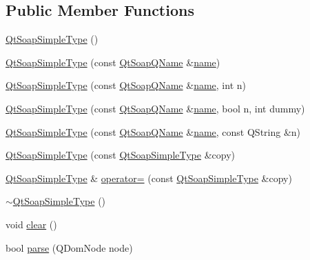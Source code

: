 \subsection*{Public Member Functions}
\begin{DoxyCompactItemize}
\item 
\mbox{\hyperlink{class_qt_soap_simple_type_ab0d80dc82ccc45e589d92f6d0dd95f94}{Qt\+Soap\+Simple\+Type}} ()
\item 
\mbox{\hyperlink{class_qt_soap_simple_type_adff3b31f44bd9520a4d7a9b61f9831ac}{Qt\+Soap\+Simple\+Type}} (const \mbox{\hyperlink{class_qt_soap_q_name}{Qt\+Soap\+Q\+Name}} \&\mbox{\hyperlink{class_qt_soap_type_a6d5fb3d1ea4cf6d1432c7f62a5da09c3}{name}})
\item 
\mbox{\hyperlink{class_qt_soap_simple_type_a68d489b4ad93f0895589953343066853}{Qt\+Soap\+Simple\+Type}} (const \mbox{\hyperlink{class_qt_soap_q_name}{Qt\+Soap\+Q\+Name}} \&\mbox{\hyperlink{class_qt_soap_type_a6d5fb3d1ea4cf6d1432c7f62a5da09c3}{name}}, int n)
\item 
\mbox{\hyperlink{class_qt_soap_simple_type_a3cb161c0fb5d1a4b310e97822935f0f8}{Qt\+Soap\+Simple\+Type}} (const \mbox{\hyperlink{class_qt_soap_q_name}{Qt\+Soap\+Q\+Name}} \&\mbox{\hyperlink{class_qt_soap_type_a6d5fb3d1ea4cf6d1432c7f62a5da09c3}{name}}, bool n, int dummy)
\item 
\mbox{\hyperlink{class_qt_soap_simple_type_aa71a79ea37f68605be315f95cbc909e7}{Qt\+Soap\+Simple\+Type}} (const \mbox{\hyperlink{class_qt_soap_q_name}{Qt\+Soap\+Q\+Name}} \&\mbox{\hyperlink{class_qt_soap_type_a6d5fb3d1ea4cf6d1432c7f62a5da09c3}{name}}, const Q\+String \&n)
\item 
\mbox{\hyperlink{class_qt_soap_simple_type_a287b8d2032e92c1d8a3d6a916097e10f}{Qt\+Soap\+Simple\+Type}} (const \mbox{\hyperlink{class_qt_soap_simple_type}{Qt\+Soap\+Simple\+Type}} \&copy)
\item 
\mbox{\hyperlink{class_qt_soap_simple_type}{Qt\+Soap\+Simple\+Type}} \& \mbox{\hyperlink{class_qt_soap_simple_type_afcf1302fb39398298d76dc9b43b7b82b}{operator=}} (const \mbox{\hyperlink{class_qt_soap_simple_type}{Qt\+Soap\+Simple\+Type}} \&copy)
\item 
\mbox{\hyperlink{class_qt_soap_simple_type_a2f515e12dd8cf786976df43a4d0de067}{$\sim$\+Qt\+Soap\+Simple\+Type}} ()
\item 
void \mbox{\hyperlink{class_qt_soap_simple_type_a046134cfc66fd8c72f6d80203d22b0c2}{clear}} ()
\item 
bool \mbox{\hyperlink{class_qt_soap_simple_type_a936b78642e838a75198346786ba2eae5}{parse}} (Q\+Dom\+Node node)

\end{DoxyCompactItemize}
